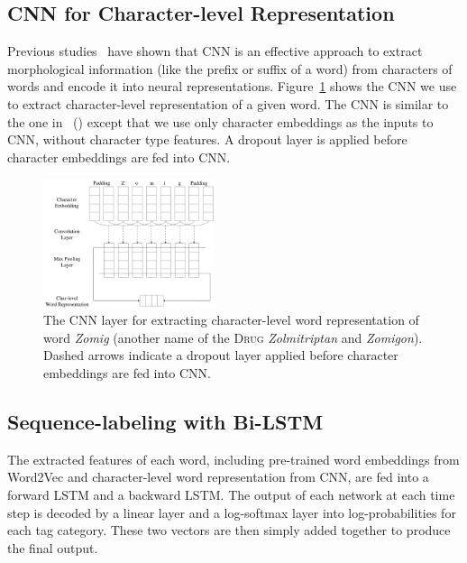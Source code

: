 \subsection{CNN for Character-level Representation}
Previous studies~\cite{TACL792} have shown that CNN is an effective approach to extract morphological
information (like the prefix or suffix of a word) from characters of words and encode it into neural representations. Figure~\ref{fig: cnn} shows the CNN we use to extract character-level representation of a given word. The CNN is similar to the one in~\citeauthor{TACL792} (\citeyear{TACL792}) except that we use only character embeddings as the inputs to CNN, without character type features. A dropout layer is applied before character embeddings are fed into CNN.
\begin{figure}[h]
	\centering
	\includegraphics[width=0.45\textwidth]{fig/CNN}
	\vspace{-0.1in}	
	\caption{The CNN layer for extracting character-level word representation of word \textit{Zomig} (another name of the \textsc{Drug} \textit{Zolmitriptan} and \textit{Zomigon}).
		Dashed arrows indicate a dropout layer applied before character embeddings are fed into CNN. }\label{fig: cnn}
	\vspace{-0.15in}	
\end{figure}


\subsection{Sequence-labeling with Bi-LSTM}

The extracted features of each word, including pre-trained word embeddings from Word2Vec and character-level word representation from CNN, are fed into a forward LSTM and a backward LSTM. The output of each network at each time step is decoded by a linear layer and a log-softmax layer into log-probabilities for each tag category. These two vectors are then simply added together to produce the final output.

